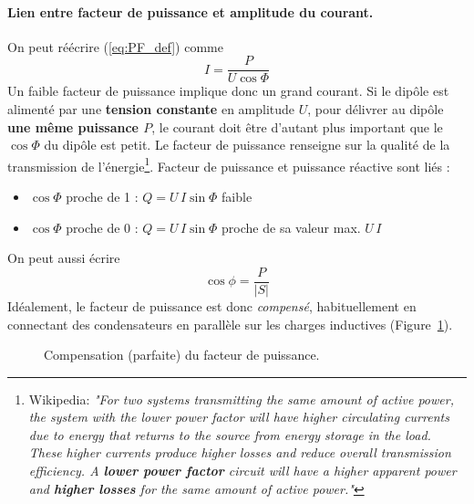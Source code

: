 \paragraph{Lien entre facteur de puissance et amplitude du courant.}
On peut réécrire (\ref{eq:PF_def}) comme 
\[I=\frac{P}{U\cos \Phi}\]
Un faible facteur de puissance implique donc un grand courant.
Si le dipôle est alimenté par une \textbf{tension constante} en amplitude $U$, pour délivrer au dipôle \textbf{une même puissance $P$}, le courant doit être  d'autant plus important que le $\cos \Phi$ du dipôle est petit. Le facteur de puissance renseigne sur la qualité de la transmission de l'énergie\footnote{Wikipedia: \textit{"For two systems transmitting the same amount of active power, the system with the lower power factor will have higher circulating currents due to energy that returns to the source from energy storage in the load. These higher currents produce higher losses and reduce overall transmission efficiency. A \textbf{lower power factor} circuit will have a higher apparent power and \textbf{higher losses} for the same amount of active power."}}. Facteur de puissance et puissance réactive sont liés :
\begin{itemize}
	\item $\cos \Phi$ proche de 1 : $Q=U\,I\sin \Phi$ faible
	\item  $\cos \Phi$ proche de 0 : $Q=U\,I\sin \Phi$ proche de sa valeur
	max. $U\,I$
\end{itemize}
On peut aussi écrire 
$$\cos \phi = \frac{P}{|S|}$$
Idéalement, le facteur de puissance est donc \textit{compensé}, habituellement en connectant des condensateurs en parallèle sur les charges inductives (Figure~\ref{fig:compensationPF}).

\begin{figure}
\centering
{} \hspace{1cm}
\caption{Compensation (parfaite) du facteur de puissance\label{fig:compensationPF}.}
\end{figure}

